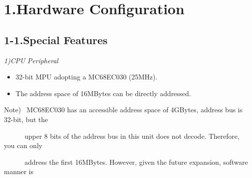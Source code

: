 \documentclass[twoside,a4paper,12pt]{article}
\begin{document}

\newpage

\cfoot{\ \\[-15mm]
- \thepage \ -}

\section*{1.Hardware Configuration}

\subsection*{1-1.Special Features}

\renewcommand{\labelitemi}{・}
\setlength{\parindent}{20mm}
\setlength{\parskip}{0mm}
\small
\itshape
1)CPU Peripheral
\begin{itemize}[leftmargin=30mm, itemsep=-1mm, topsep=1mm]
\item
32-bit MPU adopting a MC68EC030 (25MHz).
\item
The address space of 16MBytes can be directly addressed.
\end{itemize}

Note) \ MC68EC030 has an accessible address space of 4GBytes, address bus is 32-bit, but the 

\ \ \ \ \ \ upper 8 bits of the address bus in this unit does not decode. Therefore, you can only

\ \ \ \ \ \ address the first 16MBytes. However, given the future expansion, software manner is
\end{document}
